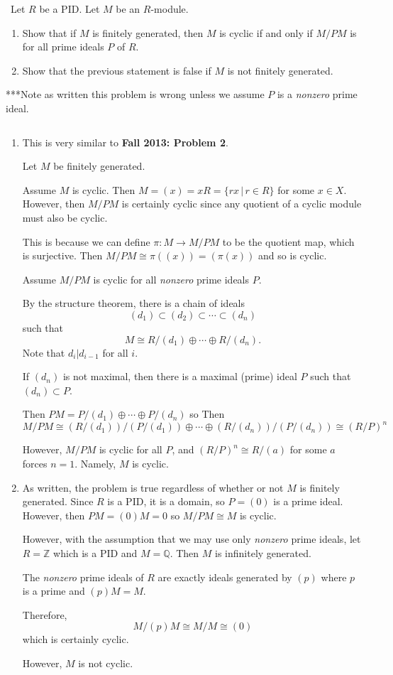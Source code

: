 \documentclass[12pt]{Qual}
\begin{document}
\begin{problem} $\,$
Let $R$ be a PID. Let $M$ be an $R$-module.
\begin{enumerate}[label=(\alph*)]
    \item Show that if $M$ is finitely generated, then $M$ is cyclic if and only if $M/PM$ is for all prime ideals $P$ of $R$.
    \item Show that the previous statement is false if $M$ is not finitely generated.
\end{enumerate}
\begin{mybox}
***Note as written this problem is wrong unless we assume $P$ is a \textit{nonzero} prime ideal.
\end{mybox}
\end{problem}


\begin{solution}$\,$
\begin{enumerate}[label=(\alph*)]
    \item This is very similar to \textbf{Fall 2013: Problem 2}.

    Let $M$ be finitely generated.

    \boxed{\implies} Assume $M$ is cyclic. Then $M=(x)=xR=\{rx\,|\,r\in R\}$ for some $x\in X$. However, then $M/PM$ is certainly cyclic since any quotient of a cyclic module must also be cyclic.

    This is because we can define $\pi:M\to M/PM$ to be the quotient map, which is surjective. Then $M/PM\cong \pi((x))=(\pi(x))$ and so is cyclic.

    \boxed{\impliedby} Assume $M/PM$ is cyclic for all \textit{nonzero} prime ideals $P$.

    By the structure theorem, there is a chain of ideals $$(d_1)\subset(d_2)\subset\cdots\subset(d_n)$$ such that $$M\cong R/(d_1)\oplus\cdots\oplus R/(d_n).$$ Note that $d_i|d_{i-1}$ for all $i$.

    If $(d_n)$ is not maximal, then there is a maximal (prime) ideal $P$ such that $(d_n)\subset P$.

    Then $PM=P/(d_1)\oplus\cdots\oplus P/(d_n)$ so
    Then $$M/PM\cong (R/(d_1))/(P/(d_1))\oplus\cdots\oplus(R/(d_n))/(P/(d_n))\cong (R/P)^n$$

    However, $M/PM$ is cyclic for all $P$, and $(R/P)^n\cong R/(a)$ for some $a$ forces $n=1.$ Namely, $M$ is cyclic.

    \item As written, the problem is true regardless of whether or not $M$ is finitely generated. Since $R$ is a PID, it is a domain, so $P=(0)$ is a prime ideal. However, then $PM=(0)M=0$ so $M/PM\cong M$ is cyclic.

    However, with the assumption that we may use only \textit{nonzero} prime ideals, let $R=\mathbb{Z}$ which is a PID and $M=\mathbb{Q}$. Then $M$ is infinitely generated.

    The \textit{nonzero} prime ideals of $R$ are exactly ideals generated by $(p)$ where $p$ is a prime and $(p)M=M$.

    Therefore, $$M/(p)M\cong M/M\cong (0)$$ which is certainly cyclic.

    However, $M$ is not cyclic.
\end{enumerate}
\end{solution}
\end{document}
